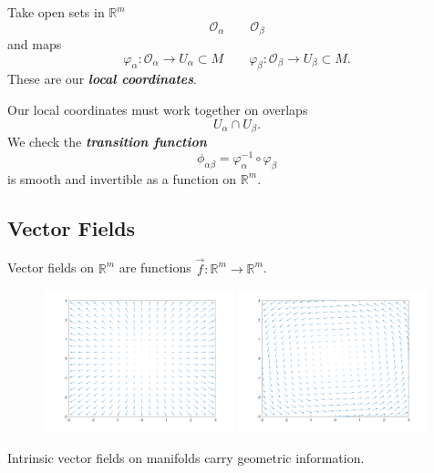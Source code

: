 \documentclass[UKenglish]{beamer}
\newcommand\boldgreen[1]{\textcolor{lighter_csu_green}{\emph{\textbf{#1}}}}
\newcommand{\R}{\mathbb{R}}
\begin{document}
\begin{frame}{}
	\vfill
	Take open sets in $\R^m$
	\[
	\mathcal{O}_\alpha \qquad \mathcal{O}_\beta
	\]
	\pause
	and maps
	\[
	\varphi_\alpha \colon \mathcal{O}_\alpha \to U_\alpha \subset M \qquad 	\varphi_\beta \colon \mathcal{O}_\beta \to U_\beta \subset M.
	\]
	\pause
	These are our \boldgreen{local coordinates}.
	\vfill
\end{frame}

\begin{frame}{}
\vfill
\begin{figure}[H]
	\centering
	\def\svgwidth{.75\columnwidth}
	
\end{figure}
\vfill
\end{frame}

\begin{frame}{}
	\vfill
	Our local coordinates must work together on overlaps
	\[
	U_\alpha \cap U_\beta.
	\]
	\pause
	We check the \boldgreen{transition function} 
	\[
	\phi_{\alpha\beta} = \varphi_\alpha^{-1} \circ \varphi_\beta
	\]
	is smooth and invertible as a function on $\R^m$.
	\vfill
\end{frame}


\begin{frame}{}
\vfill
\begin{figure}[H]
	\centering
	\def\svgwidth{\columnwidth}
	
\end{figure}
\vfill
\end{frame}

\subsection{Vector Fields}

\begin{frame}{}
	\vfill
	Vector fields on $\R^m$ are functions $\vec{f}\colon \R^m \to \R^m$.
	\begin{figure}
	   \includegraphics[width=0.49\textwidth]{div_field.png}
	   \hfill
	   \includegraphics[width=0.49\textwidth]{rot_field.png}
	\end{figure}
	\pause
	Intrinsic vector fields on manifolds carry geometric information.
	\vfill
\end{frame}
\end{document}
